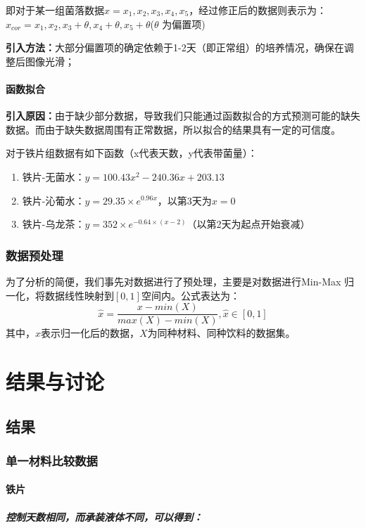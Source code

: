 \documentclass[12pt,a4paper]{ctexart}
\begin{document}
即对于某一组菌落数据${x}={x_1,x_2,x_3,x_4,x_5}$，经过修正后的数据则表示为：$x_{cor}=x_1,x_2,x_3+\theta,x_4+\theta,x_5+\theta $($\theta$ 为偏置项)

\textbf{引入方法：}大部分偏置项的确定依赖于1-2天（即正常组）的培养情况，确保在调整后图像光滑；

\paragraph{函数拟合}
\textbf{引入原因：}由于缺少部分数据，导致我们只能通过函数拟合的方式预测可能的缺失数据。而由于缺失数据周围有正常数据，所以拟合的结果具有一定的可信度。

对于铁片组数据有如下函数（x代表天数，y代表带菌量）：
\begin{enumerate}
    \item 铁片-无菌水：$ y = 100.43x^2 - 240.36x + 203.13$
    \item 铁片-沁葡水：$y = 29.35 \times e^{0.96x}$，以第3天为$x=0$
    \item 铁片-乌龙茶：$y = 352 \times e^{-0.64 \times (x-2)} $（以第2天为起点开始衰减）
\end{enumerate}

\subsubsection{数据预处理}
为了分析的简便，我们事先对数据进行了预处理，主要是对数据进行Min-Max 归一化，将数据线性映射到$[0,1]$空间内。公式表达为：
\begin{equation}
    \hat{x}=\frac{x−min(X)​}{max(X)−min(X)},\hat{x} \in [0,1]
\end{equation}
其中，$\hat{x}$表示归一化后的数据，$X$为同种材料、同种饮料的数据集。
\section{结果与讨论}
\subsection{结果}
\subsubsection{单一材料比较数据}
\paragraph{铁片}
\subparagraph{控制天数相同，而承装液体不同，可以得到：}
 
\end{document}
